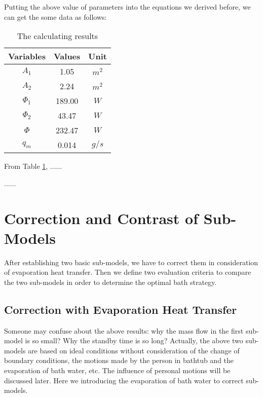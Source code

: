 \documentclass{mcmthesis}
\begin{document}
Putting the above value of parameters into the equations we derived before, we can get the some data as follows:

\begin{table}[h]  %
\centering        %
\caption{The calculating results}  %
\vspace{0.15cm}
\label{tab2}                       %
\begin{tabular}{|c|c|c|}  %
\hline                    %
Variables & Values & Unit     \\ \hline  %
$A_1$     & 1.05   &   $m^2$  \\ \hline
$A_2$     & 2.24   &   $m^2$  \\ \hline
$\Phi_1$  & 189.00 &   $W$   \\ \hline
$\Phi_2$  & 43.47  &   $W$   \\ \hline
$\Phi$    & 232.47 &   $W$   \\ \hline
$q_m$     & 0.014  &   $g/s$ \\ \hline
\end{tabular}
\end{table}

From Table \ref{tab2}, ......

......

\section{Correction and Contrast of Sub-Models}

After establishing two basic sub-models, we have to correct them in consideration of evaporation heat transfer. Then we define two evaluation criteria to compare the two sub-models in order to determine the optimal bath strategy.

\subsection{Correction with Evaporation Heat Transfer}

Someone may confuse about the above results: why the mass flow in the first sub-model is so small? Why the standby time is so long? Actually, the above two sub-models are based on ideal conditions without consideration of the change of boundary conditions, the motions made by the person in bathtub and the evaporation of bath water, etc. The influence of personal motions will be discussed later. Here we introducing the evaporation of bath water to correct sub-models.
\end{document}
